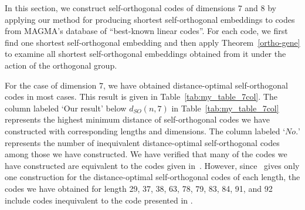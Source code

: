\documentclass{article}
\theoremstyle{definition}
\theoremstyle{remark}
\begin{document}
In this section, we construct self-orthogonal codes of dimensions $7$ and $8$ by applying our method for producing shortest self-orthogonal embeddings to codes from MAGMA's database of ``best-known linear codes''. For each code, we first find one shortest self-orthogonal embedding and then apply Theorem~\ref{ortho-gene} to examine all shortest self-orthogonal embeddings obtained from it under the action of the orthogonal group.

For the case of dimension $7$, we have obtained distance-optimal self-orthogonal codes in most cases. This result is given in Table~\ref{tab:my_table_7col}. The column labeled `Our result' below $d_{SO}(n, 7)$ in Table~\ref{tab:my_table_7col} represents the highest minimum distance of self-orthogonal codes we have constructed with corresponding lengths and dimensions. The column labeled `$No.$' represents the number of inequivalent distance-optimal self-orthogonal codes among those we have constructed. We have verified that many of the codes we have constructed are equivalent to the codes given in~\cite{Shi2025}. However, since~\cite{Shi2025} gives only one construction for the distance-optimal self-orthogonal codes of each length, the codes we have obtained for length 29, 37, 38, 63, 78, 79, 83, 84, 91, and 92 include codes inequivalent to the code presented in \cite{Shi2025}.
\end{document}
